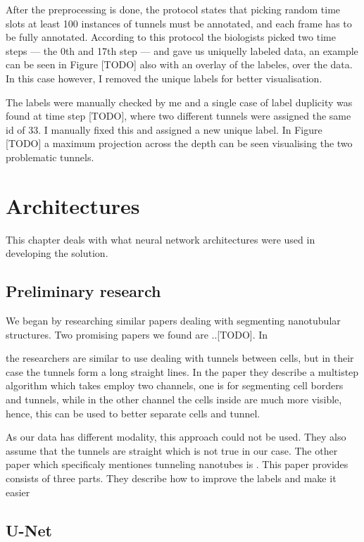 \documentclass[
  digital,     %
  oneside,     %
  nosansbold,  %
  nocolorbold, %
  lof,         %
  lot,         %
]{fithesis4}
\begin{document}
After the preprocessing is done, the protocol states that picking random time
slots at least 100 instances of tunnels must be annotated, and each frame has to
be fully annotated. According to this protocol the biologists picked two time
steps --- the 0th and 17th step --- and gave us uniquelly labeled data, an
example can be seen in Figure [TODO] also with an overlay of the labeles, over
the data. In this case however, I removed the unique labels for better
visualisation.

The labels were manually checked by me and a single case of label duplicity was
found at time step [TODO], where two different tunnels were assigned the same id
of 33. I manually fixed this and assigned a new unique label. In Figure [TODO] a
maximum projection across the depth can be seen visualising the two problematic
tunnels.

\chapter{Architectures}
This chapter deals with what neural network architectures were used in
developing the solution.

\section{Preliminary research}
We began by researching similar papers dealing with segmenting nanotubular
structures. Two promising papers we found are ..[TODO]. In

\parencite{Hodneland2006Automated} the researchers are similar to use dealing
with tunnels between cells, but in their case the tunnels form a long straight
lines. In the paper they describe a multistep algorithm which takes employ two
channels, one is for segmenting cell borders and tunnels, while in the other
channel the cells inside are much more visible, hence, this can be used to
better separate cells and tunnel.

As our data has different modality, this approach could not be used. They also
assume that the tunnels are straight which is not true in our case.
The other paper which specificaly mentiones tunneling nanotubes is
\parencite{Ceran2022TNTdetect}. This paper provides consists of three parts.
They describe how to improve the labels and make it easier 

\section{U-Net}
\label{sec:unet}
\end{document}
